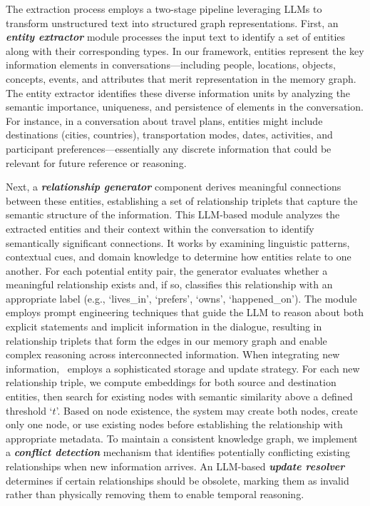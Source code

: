 The extraction process employs a two-stage pipeline leveraging LLMs to transform unstructured text into structured graph representations. First, an \textit{\textbf{entity extractor}} module processes the input text to identify a set of entities along with their corresponding types. In our framework, entities represent the key information elements in conversations—including people, locations, objects, concepts, events, and attributes that merit representation in the memory graph. The entity extractor identifies these diverse information units by analyzing the semantic importance, uniqueness, and persistence of elements in the conversation. For instance, in a conversation about travel plans, entities might include destinations (cities, countries), transportation modes, dates, activities, and participant preferences—essentially any discrete information that could be relevant for future reference or reasoning. 

Next, a \textit{\textbf{relationship generator}} component derives meaningful connections between these entities, establishing a set of relationship triplets that capture the semantic structure of the information. This LLM-based module analyzes the extracted entities and their context within the conversation to identify semantically significant connections. It works by examining linguistic patterns, contextual cues, and domain knowledge to determine how entities relate to one another. For each potential entity pair, the generator evaluates whether a meaningful relationship exists and, if so, classifies this relationship with an appropriate label (e.g., `lives\_in', `prefers', `owns', `happened\_on'). The module employs prompt engineering techniques that guide the LLM to reason about both explicit statements and implicit information in the dialogue, resulting in relationship triplets that form the edges in our memory graph and enable complex reasoning across interconnected information.
When integrating new information, \memp~employs a sophisticated storage and update strategy. For each new relationship triple, we compute embeddings for both source and destination entities, then search for existing nodes with semantic similarity above a defined threshold `$t$'. Based on node existence, the system may create both nodes, create only one node, or use existing nodes before establishing the relationship with appropriate metadata. To maintain a consistent knowledge graph, we implement a \textit{\textbf{conflict detection}} mechanism that identifies potentially conflicting existing relationships when new information arrives. An LLM-based \textbf{\textit{update resolver}} determines if certain relationships should be obsolete, marking them as invalid rather than physically removing them to enable temporal reasoning.

